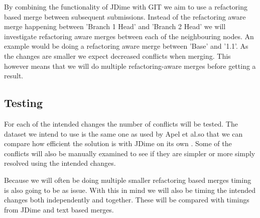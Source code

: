 \documentclass[12pt]{CRPITStyle}
\renewcommand{\cite}{\citep}
\begin{document}
By combining the functionality of JDime with GIT we aim to use a refactoring based merge between subsequent submissions.  Instead of the refactoring aware merge happening between 'Branch 1 Head' and 'Branch 2 Head' we will investigate refactoring aware merges between each of the neighbouring nodes. An example would be doing a refactoring aware merge between 'Base' and '1.1'.  As the changes are smaller we expect decreased conflicts when merging.  This however means that we will do multiple refactoring-aware merges before getting a result.

\subsection{Testing}

For each of the intended changes the number of conflicts will be tested. The dataset we intend to use is the same one as used by Apel et al.so that we can compare how efficient the solution is with JDime on its own \cite{Apel2011}. Some of the conflicts will also be manually examined to see if they are simpler or more simply resolved using the intended changes. 

Because we will often be doing multiple smaller refactoring based merges timing is also going to be as issue.  With this in mind we will also be timing the intended changes both independently and together. These will be compared with timings from JDime and text based merges.



\end{document}
